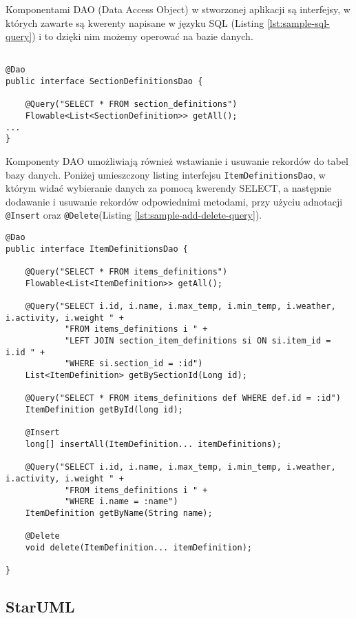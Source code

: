 \documentclass[a4paper,12pt]{article}
\begin{document}
Komponentami DAO (Data Access Object) w stworzonej aplikacji są interfejsy, w których zawarte są kwerenty napisane w języku SQL (Listing \ref{lst:sample-sql-query}) i to dzięki nim możemy operować na bazie danych.

\begin{lstlisting}[caption= Przykładowa kwerenda SQL z adnotacją \texttt{@Query} użyta w interfejsie oznaczonym adnotacją \texttt{Dao}, label={lst:sample-sql-query}]

@Dao
public interface SectionDefinitionsDao {

    @Query("SELECT * FROM section_definitions")
    Flowable<List<SectionDefinition>> getAll();
...
}
\end{lstlisting}

Komponenty DAO umożliwiają również wstawianie i usuwanie rekordów do tabel bazy danych. Poniżej umieszczony listing interfejsu \texttt{ItemDefinitionsDao}, w którym widać wybieranie danych za pomocą kwerendy SELECT, a następnie dodawanie i usuwanie rekordów odpowiednimi metodami, przy użyciu adnotacji \texttt{@Insert} oraz \texttt{@Delete}(Listing \ref{lst:sample-add-delete-query}).
\begin{lstlisting}[caption= Listing interfejsu ItemDefinitionsDao, label={lst:sample-add-delete-query}]
@Dao
public interface ItemDefinitionsDao {

    @Query("SELECT * FROM items_definitions")
    Flowable<List<ItemDefinition>> getAll();

    @Query("SELECT i.id, i.name, i.max_temp, i.min_temp, i.weather, i.activity, i.weight " +
            "FROM items_definitions i " +
            "LEFT JOIN section_item_definitions si ON si.item_id = i.id " +
            "WHERE si.section_id = :id")
    List<ItemDefinition> getBySectionId(Long id);

    @Query("SELECT * FROM items_definitions def WHERE def.id = :id")
    ItemDefinition getById(long id);

    @Insert
    long[] insertAll(ItemDefinition... itemDefinitions);

    @Query("SELECT i.id, i.name, i.max_temp, i.min_temp, i.weather, i.activity, i.weight " +
            "FROM items_definitions i " +
            "WHERE i.name = :name")
    ItemDefinition getByName(String name);

    @Delete
    void delete(ItemDefinition... itemDefinition);

}
\end{lstlisting}

\subsection{StarUML}
\end{document}
